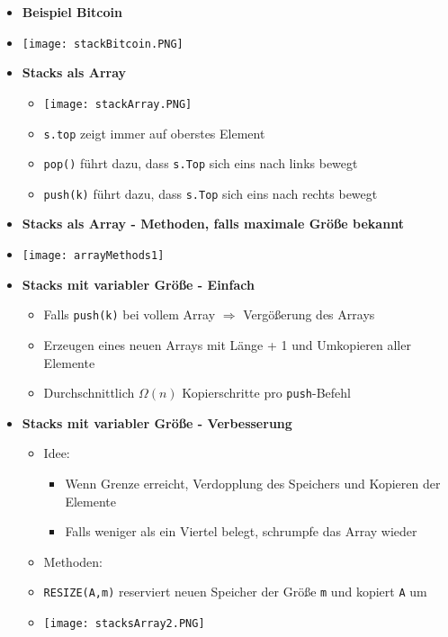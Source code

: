 \begin{itemize}
        \item \textbf{Beispiel Bitcoin}
        \item[] \texttt{[image: stackBitcoin.PNG]}
        
        \item \textbf{Stacks als Array}
            \begin{itemize}
                \item[] \texttt{[image: stackArray.PNG]}  
                \item \texttt{s.top} zeigt immer auf oberstes Element 
                \item \texttt{pop()} führt dazu, dass \texttt{s.Top} sich eins nach links bewegt
                \item \texttt{push(k)} führt dazu, dass \texttt{s.Top} sich eins nach rechts bewegt
            \end{itemize}

\pagebreak

        \item \textbf{Stacks als Array - Methoden, falls maximale Größe bekannt}
        \item[] \texttt{[image: arrayMethods1]}

        \item \textbf{Stacks mit variabler Größe - Einfach}
            \begin{itemize}
                \item Falls \texttt{push(k)} bei vollem Array $\Rightarrow$ Vergößerung des Arrays
                \item Erzeugen eines neuen Arrays mit Länge + 1 und Umkopieren aller Elemente
                \item Durchschnittlich $\Omega(n)$ Kopierschritte pro \texttt{push}-Befehl
            \end{itemize}

        \item \textbf{Stacks mit variabler Größe - Verbesserung}
            \begin{itemize}
                \item Idee: 
                    \begin{itemize}
                        \item Wenn Grenze erreicht, Verdopplung des Speichers und Kopieren der Elemente
                        \item Falls weniger als ein Viertel belegt, schrumpfe das Array wieder 
                    \end{itemize}
                \item Methoden:
                \item[] \texttt{RESIZE(A,m)} reserviert neuen Speicher der Grö\ss e \texttt{m} und kopiert \texttt{A} um
                \item[] \texttt{[image: stacksArray2.PNG]}


\end{itemize}
\end{itemize}
